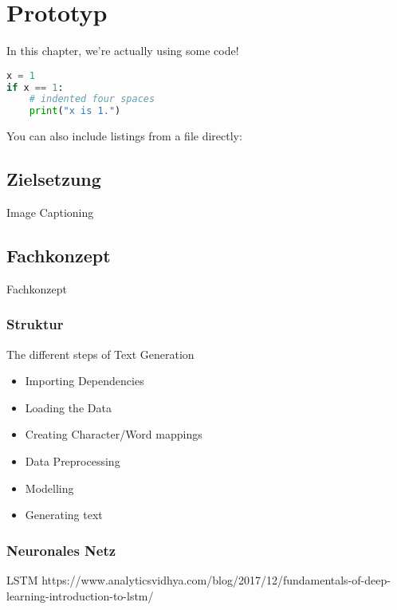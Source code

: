 \chapter{Prototyp}\label{ch:method}

In this chapter, we're actually using some code!

\begin{lstlisting}[language=Python,caption={This is an example of inline listing},captionpos=b]
x = 1
if x == 1:
    # indented four spaces
    print("x is 1.")

\end{lstlisting}

You can also include listings from a file directly:



\section{Zielsetzung}

Image Captioning

\section{Fachkonzept}

Fachkonzept

\subsection{Struktur}

The different steps of Text Generation

\begin{itemize}
\item Importing Dependencies
\item Loading the Data
\item Creating Character/Word mappings
\item Data Preprocessing
\item Modelling
\item Generating text
\end{itemize}

\subsection{Neuronales Netz}

LSTM
https://www.analyticsvidhya.com/blog/2017/12/fundamentals-of-deep-learning-introduction-to-lstm/



